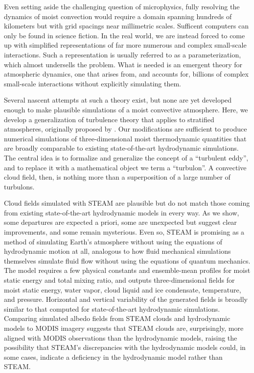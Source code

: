 \documentclass[acp, manuscript, english]{copernicus}
\begin{document}
Even setting aside the challenging question of microphysics, fully resolving the dynamics of moist convection would require a domain spanning hundreds of kilometers but with grid spacings near millimetric scales. Sufficent computers can only be found in science fiction. 
In the real world, we are instead forced to come up with simplified representations of far more numerous and complex small-scale interactions. Such a representation is usually referred to as a parameterization, which almost undersells the problem. What is needed is an emergent theory for atmospheric dynamics, one that arises from, and accounts for, billions of complex small-scale interactions without explicitly simulating them.

Several nascent attempts at such a theory exist, but none are yet developed enough to make plausible simulations of a moist convective atmosphere. 
Here, we develop a generalization of turbulence theory that applies to stratified atmospheres, originally proposed by \citet{schertzer1985}. Our modifications are sufficient to produce numerical simulations of three-dimensional moist thermodynamic quantities that are broadly comparable to existing state-of-the-art hydrodynamic simulations.
The central idea is to formalize and generalize the concept of a ``turbulent eddy'', and to replace it with a mathematical object we term a ``turbulon''. A convective cloud field, then, is nothing more than a superposition of a large number of turbulons. 

Cloud fields simulated with STEAM are plausible but do not match those coming from existing state-of-the-art hydrodynamic models in every way. As we show, some departures are expected a priori, some are unexpected but suggest clear improvements, and some remain mysterious. Even so, STEAM is promising as a method of simulating Earth's atmosphere without using the equations of hydrodynamic motion at all, analogous to how fluid mechanical simulations themselves simulate fluid flow without using the equations of quantum mechanics. The model requires a few physical constants and ensemble-mean profiles for moist static energy and total mixing ratio, and outputs three-dimensional fields for moist static energy, water vapor, cloud liquid and ice condensate, temperature, and pressure. Horizontal and vertical variability of the generated fields is broadly similar to that computed for state-of-the-art hydrodynamic simulations.
Comparing simulated albedo fields from STEAM clouds and hydrodynamic models to MODIS imagery suggests that STEAM clouds are, surprisingly, more aligned with MODIS observations than the hydrodynamic models, raising the possibility that STEAM's discrepancies with the hydrodynamic models could, in some cases, indicate a deficiency in the hydrodynamic model rather than STEAM.
\end{document}
